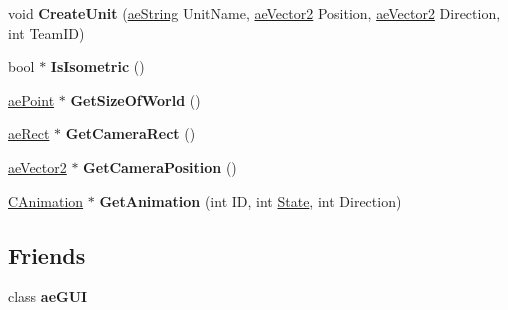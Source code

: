 \begin{DoxyCompactItemize}
\item 
void {\bfseries Create\+Unit} (\hyperlink{namespaceae_core_ad6f85aacc0d1fdd85e458e2413e60010}{ae\+String} Unit\+Name, \hyperlink{structae_core_1_1ae_vector2}{ae\+Vector2} Position, \hyperlink{structae_core_1_1ae_vector2}{ae\+Vector2} Direction, int Team\+ID)\hypertarget{classae_world_abdc06894641a479b0c548b0f49171c26}{}\label{classae_world_abdc06894641a479b0c548b0f49171c26}

\item 
bool $\ast$ {\bfseries Is\+Isometric} ()\hypertarget{classae_world_a28dd44f8ee659c36795199717ca3b7d5}{}\label{classae_world_a28dd44f8ee659c36795199717ca3b7d5}

\item 
\hyperlink{structae_core_1_1ae_point}{ae\+Point} $\ast$ {\bfseries Get\+Size\+Of\+World} ()\hypertarget{classae_world_a716fdfed8742c0e704b7813241c25173}{}\label{classae_world_a716fdfed8742c0e704b7813241c25173}

\item 
\hyperlink{structae_core_1_1ae_rect}{ae\+Rect} $\ast$ {\bfseries Get\+Camera\+Rect} ()\hypertarget{classae_world_a18a9bad12e421cbd95b70a430dd09d4b}{}\label{classae_world_a18a9bad12e421cbd95b70a430dd09d4b}

\item 
\hyperlink{structae_core_1_1ae_vector2}{ae\+Vector2} $\ast$ {\bfseries Get\+Camera\+Position} ()\hypertarget{classae_world_a9316805d3c2bec56c144548dff1f4408}{}\label{classae_world_a9316805d3c2bec56c144548dff1f4408}

\item 
\hyperlink{class_c_animation}{C\+Animation} $\ast$ {\bfseries Get\+Animation} (int ID, int \hyperlink{_base_class_8h_aded8224779c70fab5084220935d672bba46a2a41cc6e552044816a2d04634545d}{State}, int Direction)\hypertarget{classae_world_a7fc2feb0c98ecaa1f2602a1fbc1d405a}{}\label{classae_world_a7fc2feb0c98ecaa1f2602a1fbc1d405a}

\end{DoxyCompactItemize}
\subsection*{Friends}
\begin{DoxyCompactItemize}
\item 
class {\bfseries ae\+G\+UI}\hypertarget{classae_world_ad62c7f93a3011eb3196872c9589382dd}{}\label{classae_world_ad62c7f93a3011eb3196872c9589382dd}

\end{DoxyCompactItemize}
